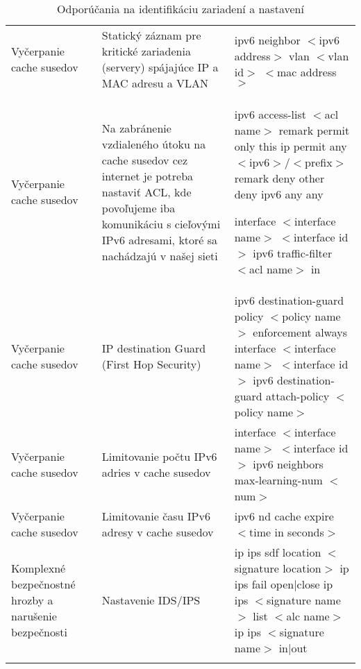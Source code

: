\begin{longtable}[!htbp]{|L{10em}L{10em}L{34em}|}
	
	
	
	Vyčerpanie cache susedov	&Statický záznam pre kritické zariadenia (servery) spájajúce IP a MAC adresu a VLAN
	&ipv6 neighbor $<$ipv6 address$>$ vlan $<$vlan id$>$ $<$mac address$>$\\
	
	
	
	
	 Vyčerpanie cache susedov	&Na zabránenie vzdialeného útoku na cache susedov cez internet je potreba nastaviť ACL, kde povoľujeme iba komunikáciu s cieľovými IPv6 adresami, ktoré sa nachádzajú v našej sieti	&ipv6 access-list $<$acl name$>$
	remark permit only this ip  
	permit any $<$ipv6$>$/$<$prefix$>$
	remark deny other
	deny ipv6 any any 
	
	interface $<$interface name$>$ $<$interface id$>$
	ipv6 traffic-filter $<$acl name$>$ in\\
	
	
	
	
	Vyčerpanie cache susedov	&IP destination Guard (First Hop Security)
	
	
	&ipv6 destination-guard policy $<$policy name$>$
	enforcement always
	interface $<$interface name$>$ $<$interface id$>$
	ipv6 destination-guard attach-policy $<$policy name$>$\\
	
	
	
	
	 Vyčerpanie cache susedov	&Limitovanie počtu IPv6 adries v cache susedov	&interface $<$interface name$>$ $<$interface id$>$
	ipv6 neighbors max-learning-num $<$num$>$\\
	
	
	
	Vyčerpanie cache susedov	&Limitovanie času IPv6 adresy v cache susedov	&ipv6 nd cache expire $<$time in seconds$>$\\
	
	
	
	 Komplexné bezpečnostné hrozby a narušenie bezpečnosti	&Nastavenie IDS/IPS	&ip ips sdf location $<$signature location$>$
	ip ips fail  open|close
	ip ips $<$signature name$>$ list $<$alc name$>$
	ip ips $<$signature name$>$ in|out\\
	
	
	\hline
\caption{Odporúčania na identifikáciu zariadení a nastavení}
\label{tab:cisco_table}%
\end{longtable}%
\restoregeometry
\normalsize

